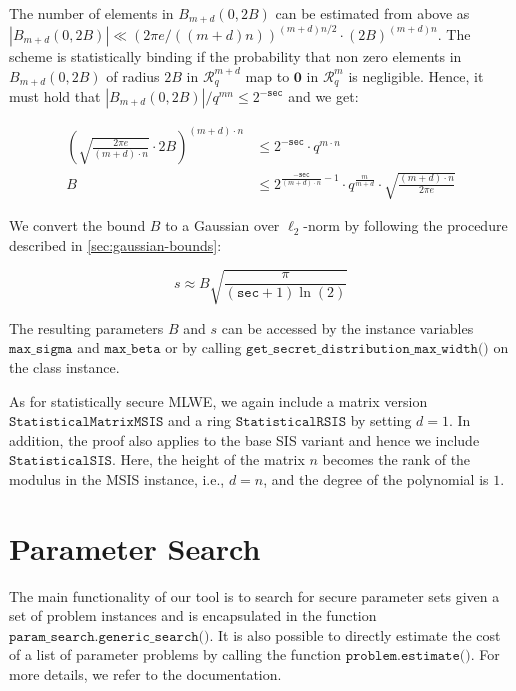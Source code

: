 The number of elements in $B_{m+d}(0, 2B)$ can be estimated from above as $|B_{m+d}(0, 2B)| \ll (2 \pi e /((m+d) n))^{(m+d) n/2} \cdot (2 B)^{(m+d) n}$. The scheme is statistically binding if the probability that non zero elements in $B_{m+d}(0, 2B)$ of radius $2B$ in $\mathcal{R}_q^{m+d}$ map to $\mathbf{0}$ in $\mathcal{R}_q^{m}$ is negligible. Hence, it must hold that $|B_{m+d}(0, 2B)|/q^{m n} \leq 2^{-\texttt{sec}}$ and we get:


\begin{align}
    \left(\sqrt{\frac{2 \pi e}{(m+d) \cdot n}} \cdot 2 B\right)^{(m+d) \cdot n} & \leq 2^{-\texttt{sec}} \cdot q^{m\cdot n}                                                                       \\
    B                                                                           & \leq 2^{\frac{-\texttt{sec}}{(m+d)\cdot n} - 1} \cdot q^\frac{m}{m+d} \cdot \sqrt{\frac{(m+d)\cdot n}{2 \pi e}}
\end{align}

We convert the bound $B$ to a Gaussian over $\ell_2$-norm by following the procedure described in \cref{sec:gaussian-bounds}: %

\begin{equation}
    s  \approx B \sqrt{\frac{\pi}{(\texttt{sec} + 1) \ln(2)}}
\end{equation}

The resulting parameters $B$ and $s$ can be accessed by the instance variables $\texttt{max\_sigma}$ and $\texttt{max\_beta}$ or by calling $\texttt{get\_secret\_distribution\_max\_width()}$ on the class instance.

As for statistically secure MLWE, we again include a matrix version $\texttt{StatisticalMatrixMSIS}$ and a ring $\texttt{StatisticalRSIS}$ by setting $d=1$. In addition, the proof also applies to the base SIS variant and hence we include $\texttt{StatisticalSIS}$. Here, the height of the matrix $n$ becomes the rank of the modulus in the MSIS instance, i.e., $d=n$, and the degree of the polynomial is $1$.



\section{Parameter Search}
The main functionality of our tool is to search for secure parameter sets given a set of problem instances and is encapsulated in the function $\texttt{param\_search.generic\_search()}$. It is also possible to directly estimate the cost of a list of parameter problems by calling the function $\texttt{problem.estimate()}$. For more details, we refer to the documentation.

